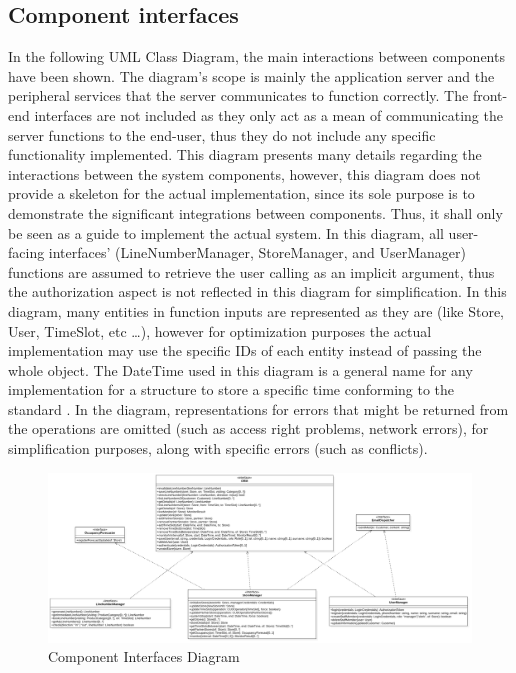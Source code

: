 \subsection{Component interfaces}
In the following UML Class Diagram, the main interactions between components have been shown.
The diagram's scope is mainly the application server and the peripheral services that the server communicates to function correctly.
The front-end interfaces are not included as they only act as a mean of communicating the server functions to the end-user, thus they do not include any specific functionality implemented.
This diagram presents many details regarding the interactions between the system components, however, this diagram does not provide a skeleton for the actual implementation, since its sole purpose is to demonstrate the significant integrations between components.
Thus, it shall only be seen as a guide to implement the actual system.
In this diagram, all user-facing interfaces' (LineNumberManager, StoreManager, and UserManager) functions are assumed to retrieve the user calling as an implicit argument, thus the authorization aspect is not reflected in this diagram for simplification.
In this diagram, many entities in function inputs are represented as they are (like Store, User, TimeSlot, etc \ldots), however for optimization purposes the actual implementation may use the specific IDs of each entity instead of passing the whole object.
The DateTime used in this diagram is a general name for any implementation for a structure to store a specific time conforming to the standard \cite{}.
In the diagram, representations for errors that might be returned from the operations are omitted (such as access right problems, network errors), for simplification purposes, along with specific errors (such as conflicts).
\begin{figure}[H]
    \centering
    \includegraphics[height=0.4\textwidth]{Images/ComponentInterfacesDiagram.png}
    \caption{Component Interfaces Diagram}
    \label{fig:ComponentInterfaces}
\end{figure}
